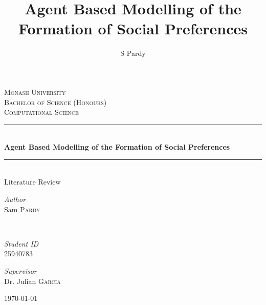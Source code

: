 \documentclass[11pt]{article}
\title{Agent Based Modelling of the Formation of Social Preferences}
\author{S Pardy}
\begin{document}
\begin{titlepage}
	\newcommand{\HRule}{\rule{\linewidth}{0.5mm}} %
	
	\center %
	
	
	\textsc{\LARGE Monash University}\\[1.5cm]	
	\textsc{\Large Bachelor of Science (Honours)}\\[0.5cm] %
	
	\textsc{\large Computational Science}\\[0.5cm] %
	
	
	\HRule\\[0.4cm]
	
	{\huge\bfseries Agent Based Modelling of the Formation of Social Preferences}\\[0.4cm]
	
    \HRule\\[1.5cm]
    

	
	{\huge Literature Review }\\[0.4cm]
	
    
    

   \vfill\vfill

	
	\begin{minipage}{0.4\textwidth}
		\begin{flushleft}
			\large
			\textit{Author}\\
			Sam \textsc{Pardy}
		\end{flushleft}
	\end{minipage}
	~
	\begin{minipage}{0.4\textwidth}
		\begin{flushright}
			\large 
			\textit{Student ID}\\
		25940783   
		\end{flushright}
	\end{minipage}
	\vfill
	\vfill
	{\large
	\textit{Supervisor}\\
	Dr. Julian \textsc{Garcia}}
	

	\vfill\vfill\vfill %
	{\large\today} %
	\vfill %
	
\end{titlepage}
\hypersetup{colorlinks, citecolor=black, filecolor=black, linkcolor=black urlcolor=black}
\end{document}
